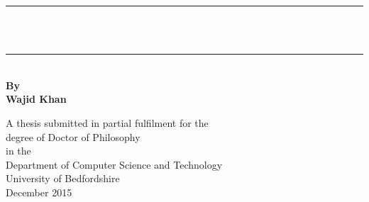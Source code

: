 \documentclass[12pt, oneside]{Thesis} %
\title{\ttitle} %
\begin{document}
\frontmatter %


\fancyhead{} %
\rhead{\thepage} %
\lhead{} %

\pagestyle{fancy} %

\newcommand{\HRule}{\rule{\linewidth}{0.5mm}} %

\hypersetup{pdfsubject=\subjectname}
\hypersetup{pdfauthor=\authornames}
\hypersetup{pdfkeywords=\keywordnames}







\begin{titlepage}
    \begin{center}
        
        \HRule \\[0.4cm] %
        {\huge \bfseries \ttitle}\\[0.4cm] %
        \HRule \\[1.5cm] %
      
        
        \vspace{3.5cm}
        \textbf{By \\}
        \vspace{0.5cm}
        \textbf{Wajid Khan}
        
        \vfill
     A thesis submitted in partial fulfilment for the \\
degree of Doctor of Philosophy\\
in the \\
Department of Computer Science and Technology \\
University of Bedfordshire \\

        
        \vspace{0.8cm}
        December 2015
        
    \end{center}
\end{titlepage}
\end{document}
